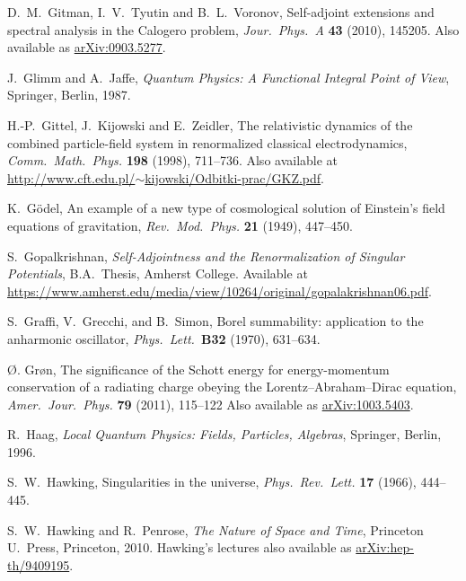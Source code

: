 \documentclass{article}
\begin{document}
\begin{thebibliography}{10}
 D.\ M.\ Gitman, I.\ V.\ Tyutin and B.\ L.\ Voronov, Self-adjoint extensions and spectral analysis in the Calogero problem,  \textsl{Jour.\ Phys.\ A} \textbf{43} (2010), 145205. Also available as \href{http://arxiv.org/abs/0903.5277}{arXiv:0903.5277}.

 J.\ Glimm and A.\ Jaffe, \textsl{Quantum Physics: A Functional Integral Point of View}, Springer, Berlin, 1987. 

 H.-P.\ Gittel, J.\ Kijowski and E.\ Zeidler, The relativistic 
dynamics of the combined particle-field system in renormalized classical 
electrodynamics, \textsl{Comm.\ Math.\ Phys.} \textbf{198} (1998), 711--736.
Also available at \href{http://www.cft.edu.pl/~kijowski/Odbitki-prac/GKZ.pdf}{http://www.cft.edu.pl/$\sim$kijowski/Odbitki-prac/GKZ.pdf}.

 K.\ G\"odel, An example of a new type of cosmological solution of Einstein's field equations of gravitation, \textsl{Rev.\ Mod.\ Phys.} \textbf{21} (1949), 447--450. 

 S.\ Gopalkrishnan, \textsl{Self-Adjointness and the Renormalization of Singular Potentials}, B.A.\ Thesis, Amherst College.  Available at \href{https://www.amherst.edu/media/view/10264/original/gopalakrishnan06.pdf}{https://www.amherst.edu/media/view/10264/original/gopalakrishnan06.pdf}.

 S.\ Graffi, V.\ Grecchi, and B.\ Simon, Borel summability: application to the anharmonic oscillator, \textsl{Phys.\ Lett.\ }\textbf{B32} (1970), 631--634.

 \O. Gr\o n, The significance of the Schott energy for energy-momentum conservation of a radiating charge obeying the Lorentz--Abraham--Dirac equation, \textsl{Amer.\ Jour.\ Phys.} \textbf{79} (2011), 115--122  Also available as \href{http://arxiv.org/abs/1003.5403}{arXiv:1003.5403}.

 R.\ Haag, \textsl{Local Quantum Physics: Fields, Particles, Algebras}, Springer, Berlin, 1996.

 S.\ W.\ Hawking, Singularities in the universe, \textsl{Phys.\ Rev.\ Lett.} \textbf{17} (1966), 444--445.

 S.\ W.\ Hawking and R.\ Penrose, \textsl{The Nature
of Space and Time}, Princeton U.\ Press, Princeton, 2010.   Hawking's lectures also available as \href{http://arxiv.org/abs/hep-th/9409195}{arXiv:hep-th/9409195}.


\end{thebibliography}
\end{document}
